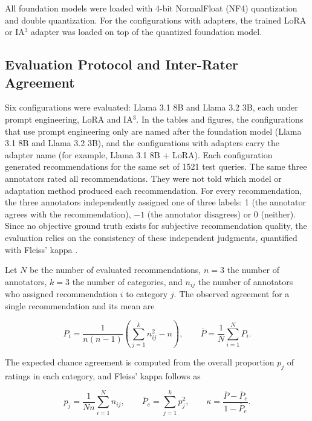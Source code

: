 \documentclass[journal,article,submit,pdftex,moreauthors]{Definitions/mdpi}
\begin{document}
All foundation models were loaded with 4-bit NormalFloat (NF4) quantization and double quantization. For the configurations with adapters, the trained LoRA or IA$^3$ adapter was loaded on top of the quantized foundation model.

\subsection{Evaluation Protocol and Inter-Rater Agreement}\label{sec:eval}
Six configurations were evaluated: Llama 3.1 8B and Llama 3.2 3B, each under prompt engineering, LoRA and IA$^3$. In the tables and figures, the configurations that use prompt engineering only are named after the foundation model (Llama 3.1 8B and Llama 3.2 3B), and the configurations with adapters carry the adapter name (for example, Llama 3.1 8B + LoRA). Each configuration generated recommendations for the same set of 1521 test queries. The same three annotators rated all recommendations. They were not told which model or adaptation method produced each recommendation. For every recommendation, the three annotators independently assigned one of three labels: 1 (the annotator agrees with the recommendation), $-1$ (the annotator disagrees) or 0 (neither). Since no objective ground truth exists for subjective recommendation quality, the evaluation relies on the consistency of these independent judgments, quantified with Fleiss' kappa \citep{fleiss1971measuring}.

Let $N$ be the number of evaluated recommendations, $n=3$ the number of annotators, $k=3$ the number of categories, and $n_{ij}$ the number of annotators who assigned recommendation $i$ to category $j$. The observed agreement for a single recommendation and its mean are

\begin{equation}
P_i = \frac{1}{n(n-1)}\left(\sum_{j=1}^{k} n_{ij}^{2} - n\right), \qquad \bar{P} = \frac{1}{N}\sum_{i=1}^{N} P_i .
\end{equation}

The expected chance agreement is computed from the overall proportion $p_j$ of ratings in each category, and Fleiss' kappa follows as

\begin{equation}
p_j = \frac{1}{Nn}\sum_{i=1}^{N} n_{ij}, \qquad \bar{P}_e = \sum_{j=1}^{k} p_j^{2}, \qquad \kappa = \frac{\bar{P} - \bar{P}_e}{1 - \bar{P}_e}.
\end{equation}
\end{document}
